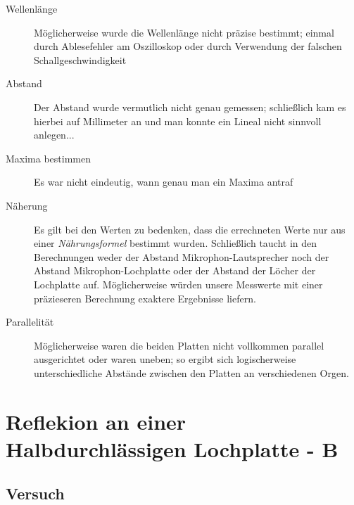 \begin{description}
\sloppy
   \item[Wellenlänge] Möglicherweise wurde die Wellenlänge nicht präzise bestimmt; einmal durch Ablesefehler am Oszilloskop oder durch Verwendung der falschen Schallgeschwindigkeit
   
   \item[Abstand] Der Abstand wurde vermutlich nicht genau gemessen; schließlich kam es hierbei auf Millimeter an und man konnte ein Lineal nicht sinnvoll anlegen...
   
   \item[Maxima bestimmen] Es war nicht eindeutig, wann genau man ein Maxima antraf
   
   \item[Näherung] Es gilt bei den Werten zu bedenken, dass die errechneten Werte nur aus einer \emph{Nährungsformel} bestimmt wurden. Schließlich taucht in den Berechnungen weder der Abstand Mikrophon-Lautsprecher noch der Abstand Mikrophon-Lochplatte oder der Abstand der Löcher der Lochplatte auf. Möglicherweise würden unsere Messwerte mit einer präzieseren Berechnung exaktere Ergebnisse liefern.
   
   \item[Parallelität] Möglicherweise waren die beiden Platten nicht vollkommen parallel ausgerichtet oder waren uneben; so ergibt sich logischerweise unterschiedliche Abstände zwischen den Platten an verschiedenen Orgen.
\end{description}






\section{Reflekion an einer Halbdurchlässigen Lochplatte - B}



\subsection{Versuch}


